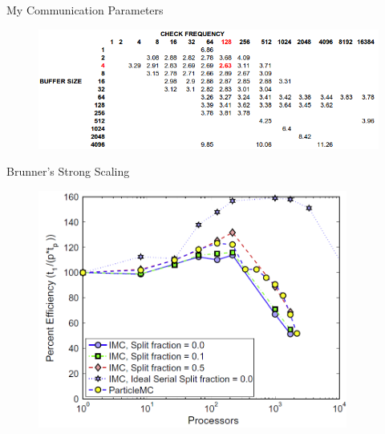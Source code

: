 \documentclass{beamer}
\begin{document}
\begin{frame}{My Communication Parameters}

  \begin{figure}[h!]
    \begin{center}
      \includegraphics[width=4.75in]{my_params.png}
    \end{center}
  \end{figure}

\end{frame}

\begin{frame}{Brunner's Strong Scaling}

  \begin{figure}[h!]
    \begin{center}
      \includegraphics[width=4in]{brunner_strong.png}
    \end{center}
  \end{figure}

\end{frame}
\end{document}
